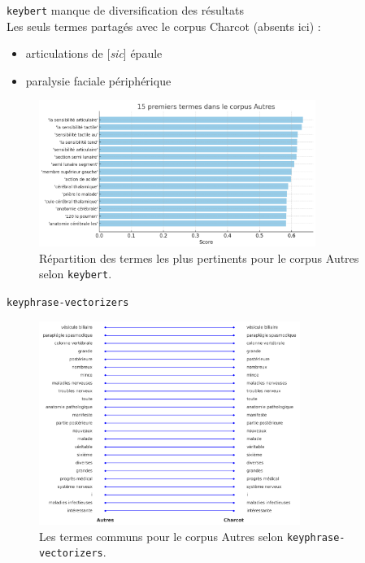 \begin{frame}{\texttt{keybert}}
\danger{} manque de diversification des résultats\\
Les seuls termes partagés avec le corpus Charcot (absents ici) : 
\begin{itemize}
\item articulations de [\textit{sic}] épaule
\item paralysie faciale périphérique
\end{itemize}
    \begin{figure}[!ht]
        \centering
        \includegraphics[width=90mm,scale=0.5]{pic/keybert_autres.png}
        \caption{Répartition des termes les plus pertinents pour le corpus \og{}Autres\fg{} selon \texttt{keybert}.}
        \label{fig:enter-label}
    \end{figure}
\end{frame}

\begin{frame}{\texttt{keyphrase-vectorizers}}
    \begin{figure}[!ht]
        \centering
        \includegraphics[width=85mm,scale=0.5]{pic/visualisation_termes_dupliques.png}
        \caption{Les termes communs pour le corpus \og{}Autres\fg{} selon \texttt{keyphrase-vectorizers}.}
        \label{fig:enter-label}
    \end{figure}
\end{frame}
